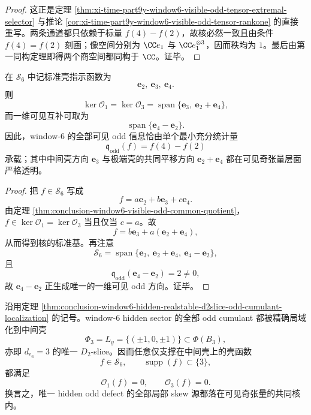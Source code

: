 \begin{proof}
这正是定理 \ref{thm:xi-time-part9y-window6-visible-odd-tensor-extremal-selector} 与推论 \ref{cor:xi-time-part9y-window6-visible-odd-tensor-rankone} 的直接重写。两条通道都只依赖于标量 \(f(4)-f(2)\)，故核必然一致且由条件 \(f(4)=f(2)\) 刻画；像空间分别为 \(\CC e_1\) 与 \(\CC e_1^{\otimes 3}\)，因而秩均为 \(1\)。最后由第一同构定理即得两个商空间都同构于 \(\CC\)。证毕。
\end{proof}

\begin{corollary}[共同核的标准基与最小充分统计]\label{cor:conclusion-window6-visible-odd-kernel-basis}
在 \(\mathcal S_6\) 中记标准壳指示函数为
\[
\mathbf e_2,\ \mathbf e_3,\ \mathbf e_4.
\]
则
\[
\ker \mathcal O_1=\ker \mathcal O_3
=
\operatorname{span}\{\mathbf e_3,\ \mathbf e_2+\mathbf e_4\},
\]
而一维可见互补可取为
\[
\operatorname{span}\{\mathbf e_4-\mathbf e_2\}.
\]
因此，window-\(6\) 的全部可见 odd 信息恰由单个最小充分统计量
\[
\mathfrak q_{\mathrm{odd}}(f)=f(4)-f(2)
\]
承载；其中中间壳方向 \(\mathbf e_3\) 与极端壳的共同平移方向 \(\mathbf e_2+\mathbf e_4\) 都在可见奇张量层面严格透明。
\end{corollary}

\begin{proof}
把 \(f\in\mathcal S_6\) 写成
\[
f=a\mathbf e_2+b\mathbf e_3+c\mathbf e_4.
\]
由定理 \ref{thm:conclusion-window6-visible-odd-common-quotient}，\(f\in\ker \mathcal O_1=\ker \mathcal O_3\) 当且仅当 \(c=a\)。故
\[
f=b\mathbf e_3+a(\mathbf e_2+\mathbf e_4),
\]
从而得到核的标准基。再注意
\[
\mathcal S_6
=
\operatorname{span}\{\mathbf e_3,\ \mathbf e_2+\mathbf e_4,\ \mathbf e_4-\mathbf e_2\},
\]
且
\[
\mathfrak q_{\mathrm{odd}}(\mathbf e_4-\mathbf e_2)=2\neq 0,
\]
故 \(\mathbf e_4-\mathbf e_2\) 正生成唯一的一维可见 odd 方向。证毕。
\end{proof}

\begin{theorem}\label{thm:conclusion-window6-hidden-odd-visible-blindness}
沿用定理 \ref{thm:conclusion-window6-hidden-realstable-d2slice-odd-cumulant-localization} 的记号。window-\(6\) hidden sector 的全部 odd cumulant 都被精确局域化到中间壳
\[
\Phi_3=L_y=\{(\pm1,0,\pm1)\}\subset \Phi(B_3),
\]
亦即 \(d_{e_6}=3\) 的唯一 \(D_2\)-slice。因而任意仅支撑在中间壳上的壳函数
\[
f\in \mathcal S_6,
\qquad
\operatorname{supp}(f)\subset\{3\},
\]
都满足
\[
\mathcal O_1(f)=0,
\qquad
\mathcal O_3(f)=0.
\]
换言之，唯一 hidden odd defect 的全部局部 skew 源都落在可见奇张量的共同核内。
\end{theorem}

